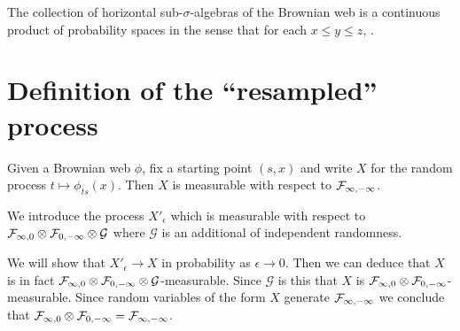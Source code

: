 {\begin{theorem}
  The collection of horizontal sub-$\sigma$-algebras of the Brownian
  web is a continuous product of probability spaces in the sense that
  for each $x \le y \le z$,  .
\end{theorem}

\section{Definition of the ``resampled'' process}

\newcommand{\sampled}{X}
\newcommand{\resamplede}{X'_{\epsilon}}
\newcommand{\reservoir}{\mathcal{G}}

\newcommand{\twostrips}{\commafactor{\infty}{0} \tensor \commafactor{0}{-\infty}}
\newcommand{\onestrip}{\commafactor{\infty}{-\infty}}

Given a Brownian web $\phi$, fix a starting point $(s,x)$ and write
$\sampled$ for the random process $t \mapsto \phi_{ts}(x)$.  Then $X$
is measurable with respect to $\onestrip$.

We introduce the process $\resamplede$ which is measurable with
respect to $\twostrips \tensor \reservoir$ where $\reservoir$ is an
additional  of
independent randomness.

We will show that $\resamplede \to \sampled$ in probability as
$\epsilon \to 0$.  Then we can deduce that $\sampled$ is in fact
$\twostrips \tensor \reservoir$-measurable.  Since $\reservoir$ is
 this  that $\sampled$ is $\twostrips$-measurable.
Since random variables of the form $\sampled$ generate
$\onestrip$ we conclude that $\twostrips = \onestrip$.

}
